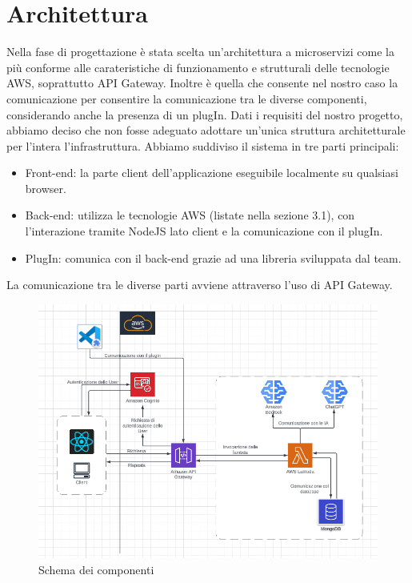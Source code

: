 \documentclass{article}
\begin{document}
\section{Architettura}
Nella fase di progettazione è stata scelta un'architettura a microservizi come la più conforme alle carateristiche di funzionamento e strutturali delle tecnologie AWS, soprattutto API Gateway. Inoltre è quella che consente nel nostro caso la comunicazione  per consentire la comunicazione tra le diverse componenti, considerando anche la presenza di un plugIn. Dati i requisiti del nostro progetto, abbiamo deciso che non fosse adeguato adottare un'unica struttura architetturale per l'intera l'infrastruttura. Abbiamo suddiviso il sistema in tre parti principali: 
\begin{itemize}
    \item Front-end: la parte client dell'applicazione eseguibile localmente su qualsiasi browser.
    \item Back-end: utilizza le tecnologie AWS (listate nella sezione 3.1), con l'interazione tramite NodeJS lato client e la comunicazione con il plugIn. 
    \item PlugIn: comunica con il back-end grazie ad una libreria sviluppata dal team.
\end{itemize}
La comunicazione tra le diverse parti avviene attraverso l'uso di API Gateway.

 \begin{figure}[H]
      \centering
      \includegraphics{documenti/grafici/schema backend.png}
      \caption{Schema dei componenti}
      \label{fig: backendscheme}
    \end{figure}
\end{document}
